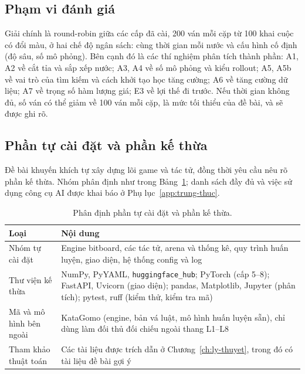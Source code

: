 \subsection{Phạm vi đánh giá}
\label{sec:gt-pham-vi-danh-gia}
Giải chính là round-robin giữa các cấp đã cài, 200 ván mỗi cặp từ 100 khai cuộc có đổi màu, ở hai chế độ ngân sách: cùng thời gian mỗi nước và cấu hình cố định (độ sâu, số mô phỏng). Bên cạnh đó là các thí nghiệm phân tích thành phần: A1, A2 về cắt tỉa và sắp xếp nước; A3, A4 về số mô phỏng và kiểu rollout; A5, A5b về vai trò của tìm kiếm và cách khởi tạo học tăng cường; A6 về tăng cường dữ liệu; A7 về trọng số hàm lượng giá; E3 về lợi thế đi trước. Nếu thời gian không đủ, số ván có thể giảm về 100 ván mỗi cặp, là mức tối thiểu của đề bài, và sẽ được ghi rõ.

\subsection{Phần tự cài đặt và phần kế thừa}
\label{sec:gt-ke-thua}
Đề bài khuyến khích tự xây dựng lõi game và tác tử, đồng thời yêu cầu nêu rõ phần kế thừa. Nhóm phân định như trong Bảng~\ref{tab:gt-ke-thua}; danh sách đầy đủ và việc sử dụng công cụ AI được khai báo ở Phụ lục~\ref{app:trung-thuc}.

\begin{table}[!htb]
  \centering\small
  \caption{Phân định phần tự cài đặt và phần kế thừa.}
  \label{tab:gt-ke-thua}
  \begin{tabularx}{\textwidth}{@{}l X@{}}
    \toprule
    \textbf{Loại} & \textbf{Nội dung} \\
    \midrule
    Nhóm tự cài đặt & Engine bitboard, các tác tử, arena và thống kê, quy trình huấn luyện, giao diện, hệ thống config và log \\
    Thư viện kế thừa & NumPy, PyYAML, \texttt{huggingface\_hub}; PyTorch (cấp 5--8); FastAPI, Uvicorn (giao diện); pandas, Matplotlib, Jupyter (phân tích); pytest, ruff (kiểm thử, kiểm tra mã) \\
    Mã và mô hình bên ngoài & KataGomo \cite{katagomo} (engine, bản vá luật, mô hình huấn luyện sẵn), chỉ dùng làm đối thủ đối chiếu ngoài thang L1--L8 \\
    Tham khảo thuật toán & Các tài liệu được trích dẫn ở Chương~\ref{ch:ly-thuyet}, trong đó có tài liệu đề bài gợi ý \cite{liu2024alphago,russell2021aima,sutton2018rl} \\
    \bottomrule
  \end{tabularx}
\end{table}

